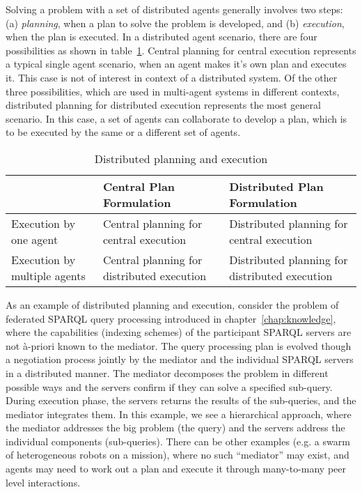   
Solving a problem with a set of distributed agents generally involves two steps: (a) {\em planning}, when a plan to solve the 
problem is developed, and (b) {\em execution}, when the plan is executed. In a distributed agent scenario, there are four 
possibilities as shown in table~\ref{tab:agents:dist-plan}. Central planning for central execution represents a typical single
agent scenario, when an agent makes it's own plan and executes it. This case is not of interest in context of a distributed
system. Of the other three possibilities, which are used in multi-agent systems in different contexts, distributed planning
for distributed execution represents the most general scenario. In this case, a set of agents can collaborate to develop a 
plan, which is to be executed by the same or a different set of agents. 

\begin{table}[htbp]
	\caption{Distributed planning and execution \label{tab:agents:dist-plan}}{
	\begin{tabular}{| p{35mm} || p{40mm} | p{40mm}| }
                \hline
                & Central Plan Formulation & Distributed Plan Formulation \\
		\hline
                \hline
                Execution by one agent & Central planning for central execution & Distributed planning for central execution \\
                \hline
                Execution by multiple agents & Central planning for distributed execution & Distributed planning for distributed execution \\
                \hline
	\end{tabular}}{}
\end{table}

As an example of distributed planning and execution, consider the problem of federated SPARQL query processing introduced in 
chapter~\ref{chap:knowledge}, where the capabilities (indexing schemes) of the participant SPARQL servers are not \`{a}-priori 
known to the mediator. The query processing plan is evolved though a negotiation process jointly by the mediator and the 
individual SPARQL servers in a distributed manner. The mediator decomposes the problem in different possible ways and the servers 
confirm if they can solve a specified sub-query. During execution phase, the servers returns the results of the sub-queries,
and the mediator integrates them. In this example, we see a hierarchical approach, where the mediator addresses the big problem
(the query) and the servers address the individual components (sub-queries).
%
There can be other examples (e.g. a swarm of heterogeneous robots on a mission), where no such ``mediator'' may exist, and agents 
may need to work out a plan and execute it through many-to-many peer level interactions. 

